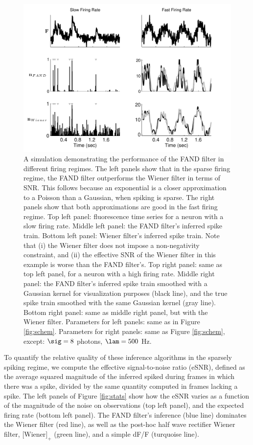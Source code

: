 \begin{figure}[H]
\centering \includegraphics[width=.9\linewidth]{../figs/example_sim}
\caption{A simulation demonstrating the performance of the FAND filter in different firing regimes. The left panels show that in the sparse firing regime, the FAND filter outperforms the Wiener filter in terms of SNR.  This follows because an exponential is a closer approximation to a Poisson than a Gaussian, when spiking is sparse. The right panels show that both approximations are good in the fast firing regime. Top left panel: fluorescence time series for a neuron with a slow firing rate.  Middle left panel: the FAND filter's inferred spike train.  Bottom left panel: Wiener filter's inferred spike train.  Note that (i) the Wiener filter does not impose a non-negativity constraint, and (ii) the effective SNR of the Wiener filter in this example is worse than the FAND filter's.  Top right panel: same as top left panel, for a neuron with a high firing rate.  Middle right panel: the FAND filter's inferred spike train smoothed with a Gaussian kernel for visualization purposes (black line), and the true spike train smoothed with the same Gaussian kernel (gray line).  Bottom right panel: same as middle right panel, but with the Wiener filter. Parameters for left panels: same as in Figure \ref{fig:schem}.  Parameters for right panels: same as Figure \ref{fig:schem}, except: $\sig=8$ photons, $\lam=500$ Hz.} \label{fig:wiener}
\end{figure}

To quantify the relative quality of these inference algorithms in the sparsely spiking regime, we compute the effective signal-to-noise ratio (eSNR), defined as the average squared magnitude of the inferred spiked during frames in which there was a spike, divided by the same quantity computed in frames lacking a spike.  The left panels of Figure \ref{fig:stats} show how the eSNR varies as a function of the magnitude of the noise on observations (top left panel), and the expected firing rate (bottom left panel).  The FAND filter's inference (blue line) dominates the Wiener filter (red line), as well as the post-hoc half wave rectifier Wiener filter, $[$Wiener$]_+$ (green line), and a simple dF/F (turquoise line).  

